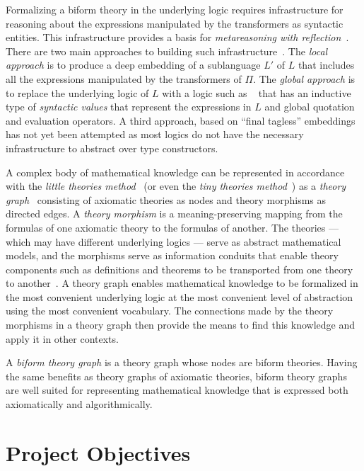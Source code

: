 \documentclass[fleqn]{llncs}
\begin{document}
Formalizing a biform theory in the underlying logic requires
infrastructure for reasoning about the expressions manipulated by the
transformers as syntactic entities.  This infrastructure provides a
basis for \emph{metareasoning with reflection}~\cite{FarmerArxiv16}.
There are two main approaches to building such
infrastructure~\cite{Farmer13}.  The \emph{local approach} is to
produce a deep embedding of a sublanguage $L'$ of $L$ that includes all
the expressions manipulated by the transformers of $\Pi$.  The
\emph{global approach} is to replace the underlying logic of $L$ with
a logic such as \churchqe~\cite{FarmerArxiv16} that has an inductive
type of \emph{syntactic values} that represent the expressions in $L$
and global quotation and evaluation operators.  A third approach,
based on ``final tagless'' embeddings~\cite{CaretteKS09} has not yet
been attempted as most logics do not have the necessary infrastructure
to abstract over type constructors.

A complex body of mathematical knowledge can be represented in
accordance with the \emph{little theories method}~\cite{FarmerEtAl92b}
(or even the \emph{tiny theories method}~\cite{CaretteOConnorTPC})
as a \emph{theory graph}~\cite{Kohlhase14} consisting of axiomatic
theories as nodes and theory morphisms as directed edges.  A
\emph{theory morphism} is a meaning-preserving mapping from the
formulas of one axiomatic theory to the formulas of another.  The
theories --- which may have different underlying logics --- serve as
abstract mathematical models, and the morphisms serve as information
conduits that enable theory components such as definitions and
theorems to be transported from one theory to
another~\cite{BarwiseSeligman97}.  A theory graph enables mathematical
knowledge to be formalized in the most convenient underlying logic at
the most convenient level of abstraction using the most convenient
vocabulary.  The connections made by the theory morphisms in a theory
graph then provide the means to find this knowledge and apply it in
other contexts.

A \emph{biform theory graph} is a theory graph whose nodes are biform
theories. Having the same benefits as theory graphs of axiomatic
theories, biform theory graphs are well suited for representing
mathematical knowledge that is expressed both axiomatically and
algorithmically.
  
\section{Project Objectives}
\end{document}
